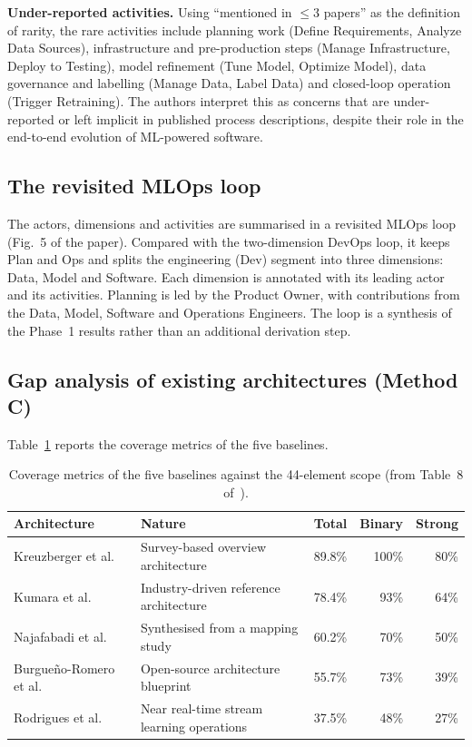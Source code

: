 \documentclass[11pt,a4paper]{article}
\begin{document}
\textbf{Under-reported activities.}
Using ``mentioned in $\leq 3$ papers'' as the definition of rarity, the rare activities include planning work (Define Requirements, Analyze Data Sources), infrastructure and pre-production steps (Manage Infrastructure, Deploy to Testing), model refinement (Tune Model, Optimize Model), data governance and labelling (Manage Data, Label Data) and closed-loop operation (Trigger Retraining). The authors interpret this as concerns that are under-reported or left implicit in published process descriptions, despite their role in the end-to-end evolution of ML-powered software.

\subsection{The revisited MLOps loop}

The actors, dimensions and activities are summarised in a revisited MLOps loop (Fig.~5 of the paper). Compared with the two-dimension DevOps loop, it keeps Plan and Ops and splits the engineering (Dev) segment into three dimensions: Data, Model and Software. Each dimension is annotated with its leading actor and its activities. Planning is led by the Product Owner, with contributions from the Data, Model, Software and Operations Engineers. The loop is a synthesis of the Phase~1 results rather than an additional derivation step.

\subsection{Gap analysis of existing architectures (Method C)}

Table~\ref{tab:coverage} reports the coverage metrics of the five baselines.

\begin{table}[h]
\centering
\caption{Coverage metrics of the five baselines against the 44-element scope (from Table~8 of~\cite{daoud2026}).}\label{tab:coverage}
\small
\begin{tabular}{@{}llrrr@{}}
\toprule
Architecture & Nature & Total & Binary & Strong \\
\midrule
Kreuzberger et al.~\cite{kreuzberger2023} & Survey-based overview architecture & 89.8\% & 100\% & 80\% \\
Kumara et al.~\cite{kumara2025} & Industry-driven reference architecture & 78.4\% & 93\% & 64\% \\
Najafabadi et al.~\cite{najafabadi2024} & Synthesised from a mapping study & 60.2\% & 70\% & 50\% \\
Burgue\~no-Romero et al.~\cite{burgueno2025} & Open-source architecture blueprint & 55.7\% & 73\% & 39\% \\
Rodrigues et al.~\cite{rodrigues2025} & Near real-time stream learning operations & 37.5\% & 48\% & 27\% \\
\bottomrule
\end{tabular}
\end{table}
\end{document}
